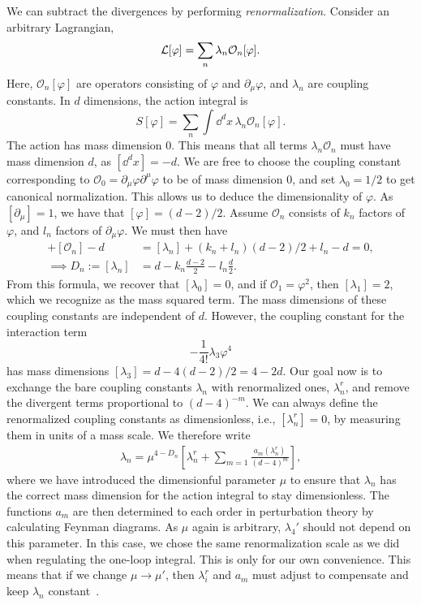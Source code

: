 We can subtract the divergences by performing \emph{renormalization}.
Consider an arbitrary Lagrangian, 
%
\begin{equation}
    \mathcal{L}[\varphi] = \sum_n \lambda_n \mathcal{O}_n[\varphi].
\end{equation}
%
Here, $\mathcal{O}_n[\varphi]$ are operators consisting of $\varphi$ and $\partial_\mu \varphi$, and $\lambda_n$ are coupling constants.
In $d$ dimensions, the action integral is
%
\begin{equation}
    S[\varphi] = \sum_n \int \dd^d x \, \lambda_n \mathcal{O}_n[\varphi].
\end{equation}
%
The action has mass dimension $0$.
This means that all terms $\lambda_n \mathcal O_n$ must have mass dimension $d$, as $[\dd^d x] = -d$.
We are free to choose the coupling constant corresponding to $\mathcal O_0 = \partial_\mu \varphi \partial^\mu \varphi$ to be of mass dimension 0, and set $\lambda_0 = 1/2$ to get canonical normalization.
This allows us to deduce the dimensionality of $\varphi$.
As $[\partial_\mu] = 1$, we have that $[\varphi] = (d-2)/2$.
Assume $\mathcal O_n$ consists of $k_n$ factors of $\varphi$, and $l_n$ factors of $\partial_\mu \varphi$.
We must then have
%
\begin{align}
    [\lambda_n] + [\mathcal{O}_n] - d &= [\lambda_n] + (k_n + l_n)(d - 2) / 2 + l_n - d = 0, \\
    \implies D_n := [\lambda_n] &= d - k_n \frac{d - 2}{2} - l_n \frac{d}{2}.
\end{align}
%
From this formula, we recover that $[\lambda_0] = 0$, and if $\mathcal O_1 = \varphi^2$, then $[\lambda_1] = 2$, which we recognize as the mass squared term.
The mass dimensions of these coupling constants are independent of $d$.
However, the coupling constant for the interaction term
\begin{equation}
    - \frac{1}{4!} \lambda_3 \varphi^4
\end{equation}
has mass dimensions $[\lambda_3] = d -4(d-2)/2 = 4 - 2d$.
Our goal now is to exchange the bare coupling constants $\lambda_n$ with renormalized ones, $\lambda_n^r$, and remove the divergent terms proportional to $(d - 4)^{-m}$.
We can always define the renormalized coupling constants as dimensionless, i.e., $[\lambda_n^r] = 0$, by measuring them in units of a mass scale.
We therefore write 
%
\begin{align}
    \lambda_n = \mu^{4 - D_n}
    \left[
        \lambda_n^r + \sum_{m=1} \frac{a_m(\lambda_n^r)}{(d - 4)^{m}}
    \right],
\end{align}
%
where we have introduced the dimensionful parameter $\mu$ to ensure that $\lambda_n$ has the correct mass dimension for the action integral to stay dimensionless.
The functions $a_m$ are then determined to each order in perturbation theory by calculating Feynman diagrams.
As $\mu$ again is arbitrary, $\lambda_4'$ should not depend on this parameter.
In this case, we chose the same renormalization scale as we did when regulating the one-loop integral.
This is only for our own convenience.
This means that if we change $\mu \rightarrow \mu'$, then $\lambda_i^r$ and $a_m$ must adjust to compensate and keep $\lambda_n$ constant~\autocite{thooftDimensionalRegularizationRenormalization1973}.


